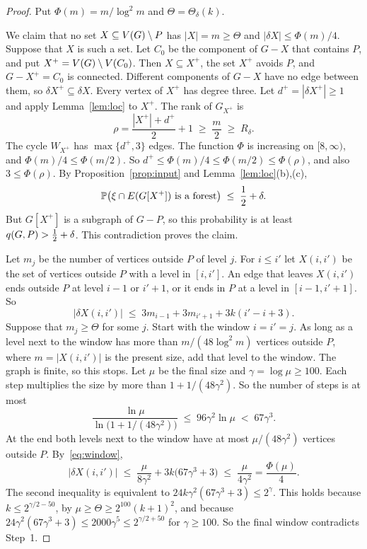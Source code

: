 \begin{proof}
Put $\Phi(m)=m/\log^{2}m$ and $\Theta=\Theta_\delta(k)$.

 We claim that no set
$X\subseteq V(G)\setminus P$ has $|X|=m\ge\Theta$ and $|\delta X|\le\Phi(m)/4$. Suppose that $X$ is such a
set. Let $C_0$ be the component of $G-X$ that contains $P$, and put $X^{+}=V(G)\setminus V(C_0)$. Then
$X\subseteq X^{+}$, the set $X^{+}$ avoids $P$, and $G-X^{+}=C_0$ is connected. Different components
of $G-X$ have no edge between them, so $\delta X^{+}\subseteq\delta X$. Every vertex of $X^{+}$ has
degree three. Let $d^{+}=|\delta X^{+}|\ge1$ and apply Lemma~\ref{lem:loc} to $X^{+}$. The rank of
$G_{X^{+}}$ is
\[
  \rho=\frac{|X^{+}|+d^{+}}2+1\;\ge\;\frac m2\;\ge\;R_\delta .
\]
The cycle $W_{X^{+}}$ has $\max\{d^{+},3\}$ edges. The function $\Phi$ is increasing on
$[8,\infty)$, and $\Phi(m)/4\le\Phi(m/2)$. So
$d^{+}\le\Phi(m)/4\le\Phi(m/2)\le\Phi(\rho)$, and also $3\le\Phi(\rho)$. By
Proposition~\ref{prop:input} and Lemma~\ref{lem:loc}(b),(c),
\[
  \mathbb{P}\bigl(\xi\cap E(G[X^{+}])\text{ is a forest}\bigr)\;\le\;\frac12+\delta .
\]
But $G[X^{+}]$ is a subgraph of $G-P$, so this probability is at least $q(G,P)>\tfrac12+\delta$. This
contradiction proves the claim.

 Let $m_j$ be the number of vertices outside $P$ of level $j$.
For $i\le i'$ let $X(i,i')$ be the set of vertices outside $P$ with a level in $[i,i']$. An edge
that leaves $X(i,i')$ ends outside $P$ at level $i-1$ or $i'+1$, or it ends in $P$ at a level in
$[i-1,i'+1]$. So
\begin{equation}\label{eq:window}
  |\delta X(i,i')|\;\le\;3m_{i-1}+3m_{i'+1}+3k(i'-i+3).
\end{equation}
Suppose that $m_j\ge\Theta$ for some $j$. Start with the window $i=i'=j$. As long as a level next
to the window has more than $m/(48\log^{2}m)$ vertices outside $P$, where $m=|X(i,i')|$ is the
present size, add that level to the window. The graph is finite, so this stops. Let $\mu$ be the
final size and $\gamma=\log\mu\ge100$. Each step multiplies the size by more than
$1+1/(48\gamma^{2})$. So the number of steps is at most
\[
  \frac{\ln\mu}{\ln\bigl(1+1/(48\gamma^{2})\bigr)}\;\le\;96\gamma^{2}\ln\mu\;<\;67\gamma^{3}.
\]
At the end both levels next to the window have at most $\mu/(48\gamma^{2})$ vertices outside $P$.
By~\eqref{eq:window},
\[
  |\delta X(i,i')|\;\le\;\frac{\mu}{8\gamma^{2}}+3k\bigl(67\gamma^{3}+3\bigr)
  \;\le\;\frac{\mu}{4\gamma^{2}}=\frac{\Phi(\mu)}4 .
\]
The second inequality is equivalent to $24k\gamma^{2}(67\gamma^{3}+3)\le2^{\gamma}$. This holds because
$k\le2^{\gamma/2-50}$, by $\mu\ge\Theta\ge2^{100}(k+1)^{2}$, and because
$24\gamma^{2}(67\gamma^{3}+3)\le2000\gamma^{5}\le2^{\gamma/2+50}$ for $\gamma\ge100$. So the final
window contradicts Step~1.
\end{proof}

